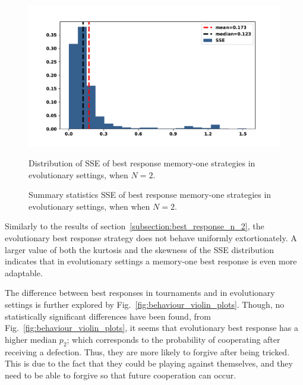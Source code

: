 \begin{figure}[!htbp]
    \begin{minipage}{0.65\textwidth}
            \begin{center}
            \includegraphics[width=\linewidth]{src/chapters/05/paper/Memory-size-in-the-prisoners-dilemma/img/evo_sserror.pdf}
            \end{center}
            \caption{Distribution of SSE of best response memory-one strategies in
            evolutionary settings, when \(N=2\).}
            \label{fig:sserror_mem_one}
    \end{minipage}\hspace{1cm}
    \begin{minipage}{0.25\textwidth}
        \centering
        \captionsetup{type=table}
        \resizebox{.75\columnwidth}{!}{%
            }
            \caption{Summary statistics SSE of best response memory-one strategies in
            evolutionary settings, when when \(N=2\).}
            \label{table:sserror_stats}
      \end{minipage}
\end{figure}

Similarly to the results of section~\ref{subsection:best_response_n_2}, the
evolutionary best response strategy does not behave uniformly extortionately. A
larger value of both the kurtosis and the skewness of the SSE distribution
indicates that in evolutionary settings a memory-one best response is even more
adaptable.

The difference between best responses in tournaments and in evolutionary
settings is further explored by Fig.~\ref{fig:behaviour_violin_plots}.
Though, no statistically significant differences have been found, from
Fig.~\ref{fig:behaviour_violin_plots}, it seems that evolutionary best
response has a higher median $p_2$; which corresponds to the probability of cooperating
after receiving a defection. Thus, they are more likely to forgive after
being tricked. This is due to the fact that they could be playing against
themselves, and they need to be able to forgive so that future cooperation can
occur.

